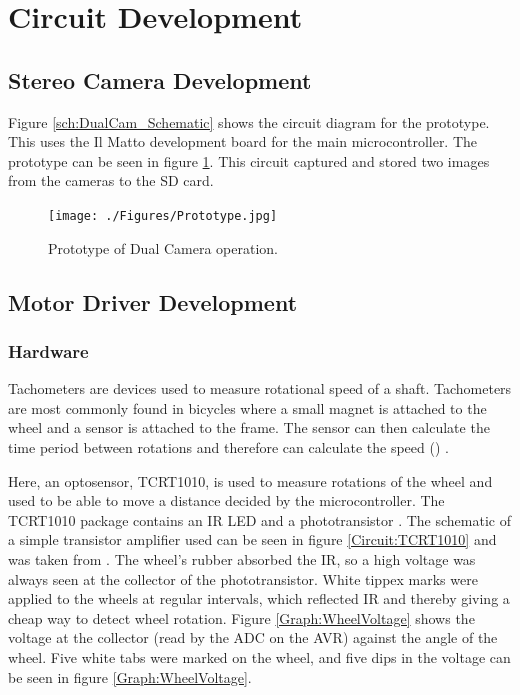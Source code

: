 \section{Circuit Development} \label{Section:Circuit_Dev}
\subsection{Stereo Camera Development}
Figure \ref{sch:DualCam_Schematic} shows the circuit diagram for the prototype. This uses the Il Matto development board for the main microcontroller. The prototype can be seen in figure \ref{fig:Prototype}. This circuit captured and stored two images from the cameras to the SD card. 
\begin{figure}
\texttt{[image: ./Figures/Prototype.jpg]}
\caption{Prototype of Dual Camera operation.}
\label{fig:Prototype}
\end{figure}
\subsection{Motor Driver Development}
\subsubsection{Hardware}
Tachometers are devices used to measure rotational speed of a shaft. Tachometers are most commonly found in bicycles where a small magnet is attached to the wheel and a sensor is attached to the frame. The sensor can then calculate the time period between rotations and therefore can calculate the speed (\citep{NEEDED}) .

Here, an optosensor, TCRT1010, is used to measure rotations of the wheel and used to be able to move a distance decided by the microcontroller. The TCRT1010 package contains an IR LED and a phototransistor \citep{Vishay:TCRT1010:Datasheet}. The schematic of a simple transistor amplifier used can be seen in figure \ref{Circuit:TCRT1010} and was taken from \cite{NEEDED}. 
The wheel's rubber absorbed the IR, so a high voltage was always seen at the collector of the phototransistor. White tippex marks were applied to the wheels at regular intervals, which reflected IR and thereby giving a cheap way to detect wheel rotation. Figure \ref{Graph:WheelVoltage} shows the voltage at the collector (read by the ADC on the AVR) against the angle of the wheel. Five white tabs were marked on the wheel, and five dips in the voltage can be seen in figure \ref{Graph:WheelVoltage}. 

